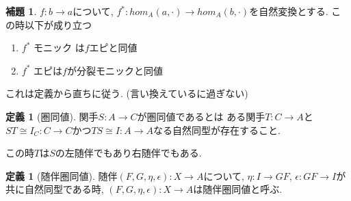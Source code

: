 \documentclass[dvipdfmx,a4paper,11pt]{report}
\theoremstyle{definition}
\newtheorem{lem}[thm]{補題}
\newtheorem{dfn}[thm]{定義}
\begin{document}
 \begin{tcolorbox}
 [colback = white, colframe = green!35!black, fonttitle = \bfseries,breakable = true]
\begin{lem}
$f: b \to a$について, $f^{*} : hom_{A} (a, \cdot) \to hom_{A}(b, \cdot)$を自然変換とする. 
この時以下が成り立つ
\begin{enumerate}
\item $f^{*}$ モニック は$f$エピと同値
\item $f^{*}$ エピは$f$が分裂モニックと同値
\end{enumerate}
\end{lem}
\end{tcolorbox}
これは定義から直ちに従う. (言い換えているに過ぎない)

 \begin{tcolorbox}
 [colback = white, colframe = green!35!black, fonttitle = \bfseries,breakable = true]
\begin{dfn}[圏同値]
関手$S : A \to C$が圏同値であるとは
ある関手$T : C \to A$と$ST \cong I_{C} : C \to C$かつ$TS \cong I : A \to A$なる自然同型が存在すること.

この時$T$は$S$の左随伴でもあり右随伴でもある. 
\end{dfn}
\end{tcolorbox}

 \begin{tcolorbox}
 [colback = white, colframe = green!35!black, fonttitle = \bfseries,breakable = true]
\begin{dfn}[随伴圏同値]
随伴$(F,G,\eta,\epsilon): X \to A$について, $\eta : I \to GF$, $\epsilon : GF \to I$が共に自然同型である時, 
$(F,G,\eta,\epsilon): X \to A$は随伴圏同値と呼ぶ. 
\end{dfn}
\end{tcolorbox}
\end{document}
